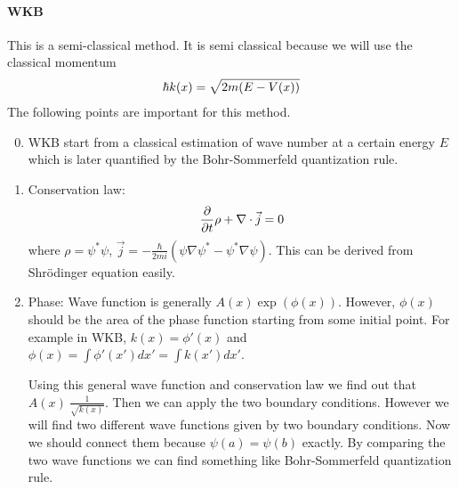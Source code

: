 \documentclass[letterpaper,10pt,english]{sphinxmanual}
\begin{document}
\paragraph{WKB}
\label{Quantum/approx:wkb}
This is a semi-classical method. It is semi classical because we will use the classical momentum
\begin{gather}
\begin{split}\hbar k(x) = \sqrt{2m (E - V(x))}\end{split}\notag
\end{gather}
The following points are important for this method.
\begin{enumerate}
\setcounter{enumi}{-1}
\item {} 
WKB start from a classical estimation of wave number at a certain energy \(E\) which is later quantified by the Bohr-Sommerfeld quantization rule.

\item {} 
Conservation law:
\begin{gather}
\begin{split}\frac{\partial}{\partial t}\rho + \nabla \cdot \vec j = 0\end{split}\notag
\end{gather}
where \(\rho = \psi^* \psi\), \(\vec j = -\frac{\hbar}{2 m i} \left( \psi \nabla \psi^* - \psi^* \nabla \psi \right)\). This can be derived from Shrödinger equation easily.

\item {} 
Phase:
Wave function is generally \(A(x)\exp(\phi(x))\). However, \(\phi(x)\) should be the area of the phase function starting from some initial point. For example in WKB, \(k(x) = \phi'(x)\) and \(\phi(x) = \int \phi'(x')d x' = \int k(x') d x'\).

Using this general wave function and conservation law we find out that \(A(x) ~ \frac{1}{\sqrt{k(x)}}\). Then we can apply the two boundary conditions. However we will find two different wave functions given by two boundary conditions. Now we should connect them because \(\psi(a) = \psi(b)\) exactly. By comparing the two wave functions we can find something like Bohr-Sommerfeld quantization rule.


\end{enumerate}
\end{document}

